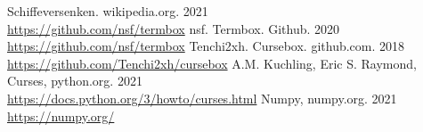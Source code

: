 \documentclass{llncs}
\begin{document}
\begin{thebibliography}{5}

Schiffeversenken. wikipedia.org. 2021\\
\url{https://github.com/nsf/termbox}
nsf. Termbox. Github. 2020\\
\url{https://github.com/nsf/termbox}
Tenchi2xh. Cursebox. github.com. 2018\\
\url{https://github.com/Tenchi2xh/cursebox}
A.M. Kuchling, Eric S. Raymond, Curses, python.org. 2021\\
\url{https://docs.python.org/3/howto/curses.html}
Numpy, numpy.org. 2021\\
\url{https://numpy.org/}
\end{thebibliography}
\end{document}
